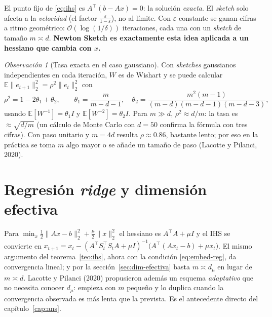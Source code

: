 \documentclass[11pt,a4paper,oneside]{book}
\theoremstyle{definition}
\theoremstyle{remark}
\newtheorem{observacion}[teorema]{Observación}
\newcommand{\E}{\mathbb{E}}
\newcommand{\cO}{\mathcal{O}}
\newcommand{\T}{^{\top}}
\newcommand{\eps}{\varepsilon}
\newcommand{\nrm}[1]{\lVert #1\rVert}
\newcommand{\dmu}{d_{\mu}}
\begin{document}
\begin{ideaclave}
El punto fijo de \eqref{eq:ihs} es $A\T(b-Ax)=0$: la solución \emph{exacta}. El \emph{sketch} solo afecta a la
\emph{velocidad} (el factor $\frac{\eps}{1-\eps}$), no al límite. Con $\eps$ constante se ganan cifras a ritmo
geométrico: $\cO(\log(1/\delta))$ iteraciones, cada una con un \emph{sketch} de tamaño $m\asymp d$.
\textbf{Newton Sketch es exactamente esta idea aplicada a un hessiano que cambia con $x$.}
\end{ideaclave}

\begin{observacion}[Tasa exacta en el caso gaussiano]\label{obs:ihs-exacta}
Con \emph{sketches} gaussianos independientes en cada iteración, $W$ es de Wishart y se puede calcular
$\E\nrm{e_{t+1}}_2^2=\rho^2\nrm{e_t}_2^2$ con
\[ \rho^2=1-2\theta_1+\theta_2,\qquad\theta_1=\frac{m}{m-d-1},\quad\theta_2=\frac{m^2(m-1)}{(m-d)(m-d-1)(m-d-3)}, \]
usando $\E[W^{-1}]=\theta_1I$ y $\E[W^{-2}]=\theta_2I$. Para $m\gg d$, $\rho^2\approx d/m$: la tasa es
$\approx\sqrt{d/m}$ (un cálculo de Monte Carlo con $d=50$ confirma la fórmula con tres cifras). Con paso unitario
y $m=4d$ resulta $\rho\approx0.86$, bastante lento; por eso en la práctica se toma $m$ algo mayor o se añade un
tamaño de paso (Lacotte y Pilanci, 2020).
\end{observacion}

\section{Regresión \emph{ridge} y dimensión efectiva}

Para $\min_x\tfrac12\nrm{Ax-b}_2^2+\tfrac\mu2\nrm{x}_2^2$ el hessiano es $A\T A+\mu I$ y el IHS se convierte en
$x_{t+1}=x_t-(A\T S_t\T S_tA+\mu I)^{-1}\bigl(A\T(Ax_t-b)+\mu x_t\bigr)$. El mismo argumento del
teorema~\ref{teo:ihs}, ahora con la condición \eqref{eq:embed-reg}, da convergencia lineal; y por la
sección~\ref{sec:dim-efectiva} basta $m\asymp\dmu$ en lugar de $m\asymp d$. Lacotte y Pilanci (2020) propusieron
además un esquema \emph{adaptativo} que no necesita conocer $\dmu$: empieza con $m$ pequeño y lo duplica cuando la
convergencia observada es más lenta que la prevista. Es el antecedente directo del capítulo~\ref{cap:ans}.
\end{document}
